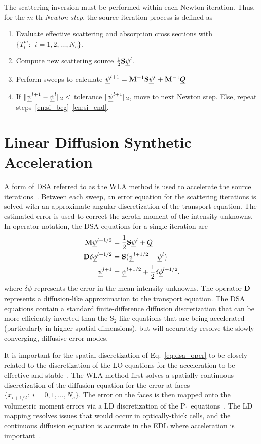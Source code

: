 The scattering inversion must be
performed within each Newton iteration.  Thus, for the $m$-th \emph{Newton step}, the source
iteration process is defined as
\begin{enumerate}
    \item Evaluate effective scattering and absorption cross sections with
        ${\{T^m_i:\;\, i=1,2,\ldots,N_c\}}$.
    \item\label{en:si_beg} Compute new scattering source $\frac{1}{2}\mathbf{S} \underline{\psi}^l$.
    \item Perform sweeps to calculate $\underline{\psi}^{l+1} = \mathbf{M}^{-1} \mathbf{S}\underline{\psi}^{l} + \mathbf{M}^{-1} \underline{Q}$
    \item\label{en:si_end} If $\|\underline{\psi}^{l+1} - \underline{\psi}^{l} \|_2 < $ tolerance
        $\|\underline{\psi}^{l+1}\|_2$, move to next Newton step. Else, repeat steps~\ref{en:si_beg}--\ref{en:si_end}.
\end{enumerate}

\section{Linear Diffusion Synthetic Acceleration}

A form of DSA referred to as the WLA method is used to accelerate the source
iterations~\cite{wla,wla_thesis}. 
Between each sweep, an error equation for the scattering iterations is solved with an approximate angular
discretization of the transport equation.  The estimated error is used to correct the
zeroth moment of the intensity unknowns.  In operator notation, the DSA equations for a single
iteration are
\begin{align}
    \mathbf{M} \underline{\psi}^{l+1/2} &= \frac{1}{2}\mathbf{S} \underline{\psi}^{l} + \underline{Q} \\
    \mathbf{D} \delta \underline{\phi}^{l+1/2} &= \mathbf{S} (\underline{\psi}^{l+1/2} - \underline{\psi}^{l}) \label{eq:dsa_oper} \\
    \underline{\psi}^{l+1} &= \underline{\psi}^{l+1/2} + \frac{1}{2}\delta \underline{\phi}^{l+1/2},
\end{align}
where $\delta \phi$ represents the error in the mean intensity unknowns.
The operator $\mathbf{D}$ represents a diffusion-like approximation to the transport equation. The DSA equations contain a standard
finite-difference diffusion discretization that can be more efficiently
inverted than the S$_2$-like equations that are being accelerated (particularly in higher
spatial dimensions), but will accurately resolve the
slowly-converging, diffusive error modes. 

It is important for the spatial discretization of Eq.~\eqref{eq:dsa_oper} to be closely related to the discretization of the LO equations for the
acceleration to be effective and stable~\cite{adams_dsa}.  The WLA method first solves a spatially-continuous
discretization of the diffusion equation
for the error at faces $\{x_{i+1/2}:\; i=0,1,\ldots,N_c\}$.  The error on the faces is then mapped onto the
volumetric moment errors via a LD discretization of the P$_1$ equations~\cite{wla}.
The LD mapping resolves issues that would occur in optically-thick cells, and the
continuous diffusion equation is accurate in the EDL where acceleration is important~\cite{adams_dsa}.

